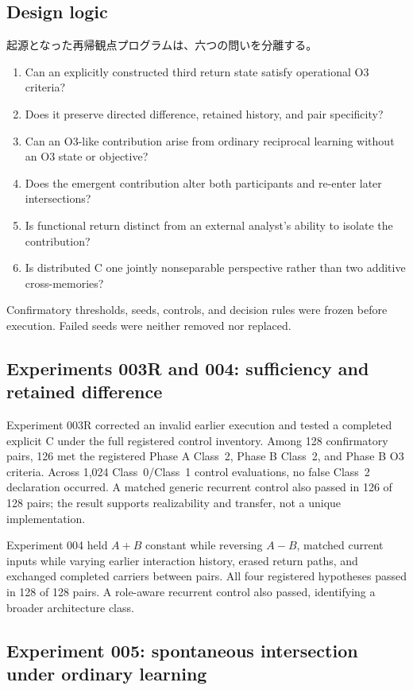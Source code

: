 \documentclass[11pt,a4paper]{article}
\begin{document}
\subsection{Design logic}

起源となった再帰観点プログラムは、六つの問いを分離する。
\begin{enumerate}
  \item Can an explicitly constructed third return state satisfy operational O3 criteria?
  \item Does it preserve directed difference, retained history, and pair specificity?
  \item Can an O3-like contribution arise from ordinary reciprocal learning without an O3 state or objective?
  \item Does the emergent contribution alter both participants and re-enter later intersections?
  \item Is functional return distinct from an external analyst's ability to isolate the contribution?
  \item Is distributed C one jointly nonseparable perspective rather than two additive cross-memories?
\end{enumerate}
Confirmatory thresholds, seeds, controls, and decision rules were frozen before execution. Failed seeds were neither removed nor replaced.

\subsection{Experiments 003R and 004: sufficiency and retained difference}

Experiment 003R corrected an invalid earlier execution and tested a completed explicit C under the full registered control inventory. Among 128 confirmatory pairs, 126 met the registered Phase A Class~2, Phase B Class~2, and Phase B O3 criteria. Across 1,024 Class~0/Class~1 control evaluations, no false Class~2 declaration occurred. A matched generic recurrent control also passed in 126 of 128 pairs; the result supports realizability and transfer, not a unique implementation.

Experiment 004 held $A+B$ constant while reversing $A-B$, matched current inputs while varying earlier interaction history, erased return paths, and exchanged completed carriers between pairs. All four registered hypotheses passed in 128 of 128 pairs. A role-aware recurrent control also passed, identifying a broader architecture class.

\subsection{Experiment 005: spontaneous intersection under ordinary learning}
\end{document}
